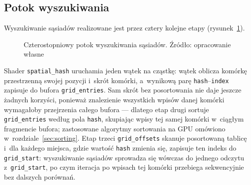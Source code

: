 \subsection{Potok wyszukiwania}
\label{subsec:neighbor_pipeline}

Wyszukiwanie sąsiadów realizowane jest przez cztery kolejne etapy
(rysunek~\ref{fig:neighbor_pipeline}).

\begin{figure}[H]
\centering
{}
\caption{Czterostopniowy potok wyszukiwania sąsiadów. Źródło: opracowanie własne}
\label{fig:neighbor_pipeline}
\end{figure}

Shader \texttt{spatial\_hash} uruchamia jeden wątek na cząstkę: wątek
oblicza komórkę przestrzenną swojej pozycji i~skrót komórki, a~wynikową
parę \texttt{hash}--\texttt{index} zapisuje do bufora \texttt{grid\_entries}.
Sam skrót bez posortowania nie daje jeszcze żadnych korzyści, ponieważ
znalezienie wszystkich wpisów danej komórki wymagałoby przejrzenia całego
bufora --- dlatego etap drugi sortuje \texttt{grid\_entries} według pola
\texttt{hash}, skupiając wpisy tej samej komórki w~ciągłym fragmencie
bufora; zastosowane algorytmy sortowania na GPU omówiono
w~rozdziale~\ref{sec:sorting}.
Etap trzeci \texttt{grid\_offsets} skanuje posortowaną tablicę i~dla
każdego miejsca, gdzie wartość \texttt{hash} zmienia się, zapisuje ten
indeks do \texttt{grid\_start}: wyszukiwanie sąsiadów sprowadza się wówczas
do jednego odczytu z~\texttt{grid\_start}, po czym iteracja po wpisach tej
komórki przebiega sekwencyjnie bez dalszych porównań.

